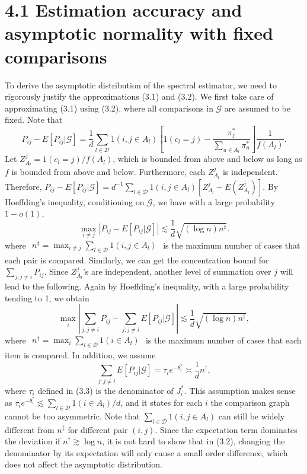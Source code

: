 \section{4.1 Estimation accuracy and asymptotic normality with fixed comparisons}\label{estimation-accuracy-and-asymptotic-normality-with-fixed-comparisons}

To derive the asymptotic distribution of the spectral estimator, we need to rigorously justify the approximations (3.1) and (3.2). We first take care of approximating (3.1) using (3.2), where all comparisons in \(\mathcal{G}\) are assumed to be fixed. Note that
\[
P_{ij} - E[P_{ij}|\mathcal{G}] = \frac{1}{d}\sum_{l\in \mathcal{D}}1(i,j\in A_l)\left[1(c_l = j) - \frac{\pi_j^*}{\sum_{u\in A_l}\pi_u^*}\right]\frac{1}{f(A_l)}.
\]
Let \(Z_{A_l}^j = 1(c_l = j) / f(A_l)\), which is bounded from above and below as long as \(f\) is bounded from above and below. Furthermore, each \(Z_{A_l}^j\) is independent. Therefore, \(P_{ij} - E[P_{ij}|\mathcal{G}] = d^{- 1}\sum_{l\in \mathcal{D}}1(i,j\in A_l)[Z_{A_l}^j - E(Z_{A_l}^j)]\). By Hoeffding's inequality, conditioning on \(\mathcal{G}\), we have with a large probability \(1 - o(1)\),
\[
\max_{i\neq j}\left|P_{ij} - E[P_{ij}|\mathcal{G}]\right|\lesssim \frac{1}{d}\sqrt{(\log n)n^{\ddagger}}.
\]
where \(\begin{array}{r}{n^{\ddagger} = \max_{i\neq j}\sum_{l\in \mathcal{D}}1(i,j\in A_{l})} \end{array}\) is the maximum number of cases that each pair is compared. Similarly, we can get the concentration bound for \(\sum_{j:j\neq i}P_{ij}\). Since \(Z_{A_{l}}^{j}\)'s are independent, another level of summation over \(j\) will lead to the following. Again by Hoeffding's inequality, with a large probability tending to 1, we obtain
\[
\max_{i}\left|\sum_{j:j\neq i}P_{ij} - \sum_{j:j\neq i}E[P_{ij}|\mathcal{G}]\right|\lesssim \frac{1}{d}\sqrt{(\log n)n^{\dagger}},
\]
where \(\begin{array}{r}{n^{\dagger} = \max_{i}\sum_{l\in \mathcal{D}}1(i\in A_{l})} \end{array}\) is the maximum number of cases that each item is compared. In addition, we assume
\[
\sum_{j:j\neq i}E[P_{ij}|\mathcal{G}] = \tau_{i}e^{-\theta_{i}^{*}}\asymp \frac{1}{d} n^{\dagger},
\]
where \(\tau_{i}\) defined in (3.3) is the denominator of \(J_{i}^{*}\). This assumption makes sense as \(\tau_{i}e^{- \theta_{i}^{*}}\lesssim \sum_{l\in \mathcal{D}}1(i\in A_{l}) / d\), and it states for each \(i\) the comparison graph cannot be too asymmetric. Note that \(\sum_{l\in \mathcal{D}}1(i,j\in A_{l})\) can still be widely different from \(n^{\ddagger}\) for different pair \((i,j)\). Since the expectation term dominates the deviation if \(n^{\dagger}\gtrsim \log n\), it is not hard to show that in (3.2), changing the denominator by its expectation will only cause a small order difference, which does not affect the asymptotic distribution.

